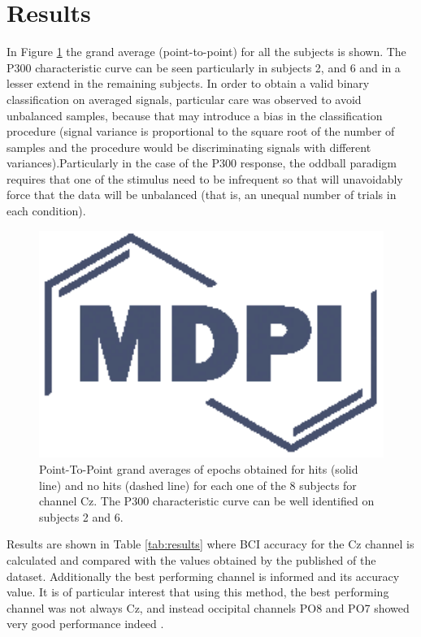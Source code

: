 \documentclass[entropy,article,submit,moreauthors,pdftex,10pt,a4paper]{mdpi}
\begin{document}
\section{Results}

In Figure \ref{fig:subjectaveraged} the grand average (point-to-point) for all the subjects is shown.  The P300 characteristic curve can be seen particularly in subjects 2, and 6 and in a lesser extend in the remaining subjects. In order to obtain a valid binary classification on averaged signals, particular care was observed to avoid unbalanced samples, because that may introduce a bias in the classification procedure (signal variance is proportional to the square root of the number of samples and the procedure would be discriminating signals with different variances).Particularly in the case of the P300 response, the oddball paradigm requires that one of the stimulus need to be infrequent so that will unavoidably force that the data will be unbalanced (that is, an unequal number of trials in each condition).


\begin{figure}[H]
\centering
\includegraphics[width=16cm]{subjectaveraged.eps}
\caption{Point-To-Point grand averages of epochs obtained for hits (solid line) and no hits (dashed line) for each one of the 8 subjects for channel Cz. The P300 characteristic curve can be well identified on subjects 2 and 6.}
\label{fig:subjectaveraged}
\end{figure}

Results are shown in Table \ref{tab:results} where BCI accuracy
for the Cz channel is calculated and compared with the values obtained by the published of the dataset.  Additionally the best performing channel is informed and its accuracy value.  It is of particular interest that using this method, the best performing channel was not always Cz, and instead occipital channels PO8 and PO7 showed very good performance indeed \citep{Huggins2016,Jure2016}.
\end{document}
